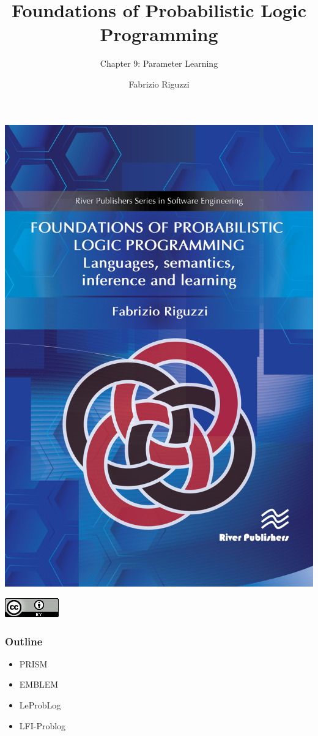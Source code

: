 \documentclass[trans,aspectratio=1610]{beamer}
\title[PLP - Ch 9]
{Foundations of Probabilistic Logic Programming}
\subtitle{Chapter 9: Parameter Learning}
\author[F. Riguzzi] %
{Fabrizio Riguzzi}
\institute[] %
{
}
\date{}
\begin{document}
\begin{frame}
\titlepage
\vspace{-2cm}
\begin{center}
\includegraphics[scale=0.120]{plp-book.jpg}

\includegraphics[scale=0.3]{cc-by.png}

\end{center}
\end{frame}



\begin{frame}
  \frametitle{Outline}

\begin{itemize}
\item PRISM
\item EMBLEM
\item LeProbLog
\item LFI-Problog
\end{itemize}
\end{frame}
\end{document}

